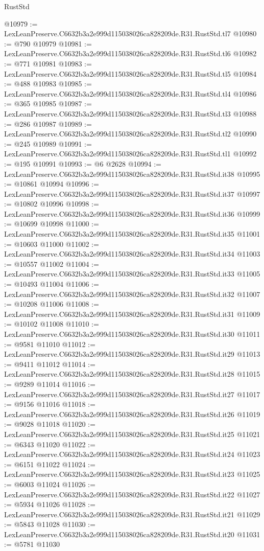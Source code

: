\begin{lexlean}{RustStd}
\begin{coremodule}
@10979 := LexLeanPreserve.C6632b3a2e999d115038026ca828209de.R31.RustStd.tl7
@10980 := @790 @10979
@10981 := LexLeanPreserve.C6632b3a2e999d115038026ca828209de.R31.RustStd.tl6
@10982 := @771 @10981
@10983 := LexLeanPreserve.C6632b3a2e999d115038026ca828209de.R31.RustStd.tl5
@10984 := @488 @10983
@10985 := LexLeanPreserve.C6632b3a2e999d115038026ca828209de.R31.RustStd.tl4
@10986 := @365 @10985
@10987 := LexLeanPreserve.C6632b3a2e999d115038026ca828209de.R31.RustStd.tl3
@10988 := @286 @10987
@10989 := LexLeanPreserve.C6632b3a2e999d115038026ca828209de.R31.RustStd.tl2
@10990 := @245 @10989
@10991 := LexLeanPreserve.C6632b3a2e999d115038026ca828209de.R31.RustStd.tl1
@10992 := @195 @10991
@10993 := @6 @2628
@10994 := LexLeanPreserve.C6632b3a2e999d115038026ca828209de.R31.RustStd.it38
@10995 := @10861 @10994
@10996 := LexLeanPreserve.C6632b3a2e999d115038026ca828209de.R31.RustStd.it37
@10997 := @10802 @10996
@10998 := LexLeanPreserve.C6632b3a2e999d115038026ca828209de.R31.RustStd.it36
@10999 := @10699 @10998
@11000 := LexLeanPreserve.C6632b3a2e999d115038026ca828209de.R31.RustStd.it35
@11001 := @10603 @11000
@11002 := LexLeanPreserve.C6632b3a2e999d115038026ca828209de.R31.RustStd.it34
@11003 := @10557 @11002
@11004 := LexLeanPreserve.C6632b3a2e999d115038026ca828209de.R31.RustStd.it33
@11005 := @10493 @11004
@11006 := LexLeanPreserve.C6632b3a2e999d115038026ca828209de.R31.RustStd.it32
@11007 := @10208 @11006
@11008 := LexLeanPreserve.C6632b3a2e999d115038026ca828209de.R31.RustStd.it31
@11009 := @10102 @11008
@11010 := LexLeanPreserve.C6632b3a2e999d115038026ca828209de.R31.RustStd.it30
@11011 := @9581 @11010
@11012 := LexLeanPreserve.C6632b3a2e999d115038026ca828209de.R31.RustStd.it29
@11013 := @9411 @11012
@11014 := LexLeanPreserve.C6632b3a2e999d115038026ca828209de.R31.RustStd.it28
@11015 := @9289 @11014
@11016 := LexLeanPreserve.C6632b3a2e999d115038026ca828209de.R31.RustStd.it27
@11017 := @9156 @11016
@11018 := LexLeanPreserve.C6632b3a2e999d115038026ca828209de.R31.RustStd.it26
@11019 := @9028 @11018
@11020 := LexLeanPreserve.C6632b3a2e999d115038026ca828209de.R31.RustStd.it25
@11021 := @6343 @11020
@11022 := LexLeanPreserve.C6632b3a2e999d115038026ca828209de.R31.RustStd.it24
@11023 := @6151 @11022
@11024 := LexLeanPreserve.C6632b3a2e999d115038026ca828209de.R31.RustStd.it23
@11025 := @6003 @11024
@11026 := LexLeanPreserve.C6632b3a2e999d115038026ca828209de.R31.RustStd.it22
@11027 := @5934 @11026
@11028 := LexLeanPreserve.C6632b3a2e999d115038026ca828209de.R31.RustStd.it21
@11029 := @5843 @11028
@11030 := LexLeanPreserve.C6632b3a2e999d115038026ca828209de.R31.RustStd.it20
@11031 := @5781 @11030

\end{coremodule}
\end{lexlean}
